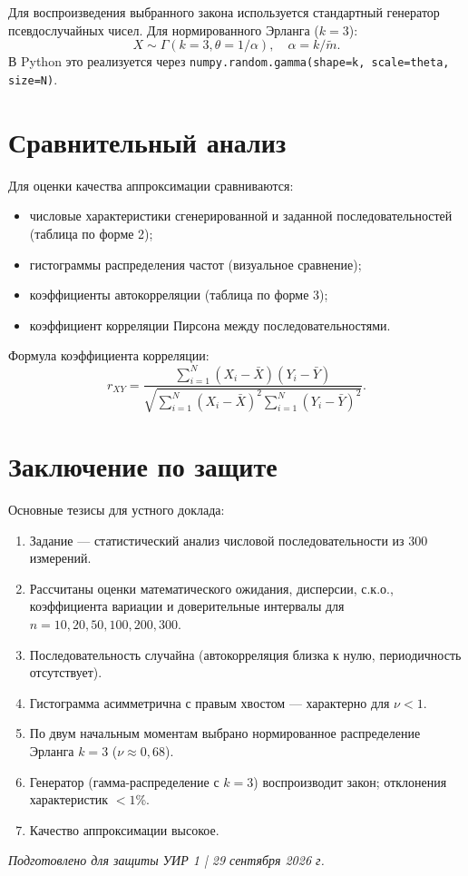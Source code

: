 \documentclass[a4paper,12pt]{article}
\begin{document}
Для воспроизведения выбранного закона используется стандартный генератор псевдослучайных чисел.
Для нормированного Эрланга ($k=3$):
\begin{equation}
X \sim \Gamma(k=3, \theta = 1/\alpha), \quad \alpha = k/\tilde{m}.
\end{equation}
В Python это реализуется через \texttt{numpy.random.gamma(shape=k, scale=theta, size=N)}.

\section{Сравнительный анализ}

Для оценки качества аппроксимации сравниваются:
\begin{itemize}
    \item числовые характеристики сгенерированной и заданной последовательностей (таблица по форме 2);
    \item гистограммы распределения частот (визуальное сравнение);
    \item коэффициенты автокорреляции (таблица по форме 3);
    \item коэффициент корреляции Пирсона между последовательностями.
\end{itemize}

Формула коэффициента корреляции:
\begin{equation}\label{eq:corr}
r_{XY} = \frac{\sum_{i=1}^{N}(X_i - \bar{X})(Y_i - \bar{Y})}{\sqrt{\sum_{i=1}^{N}(X_i - \bar{X})^2 \sum_{i=1}^{N}(Y_i - \bar{Y})^2}}.
\end{equation}

\section{Заключение по защите}

Основные тезисы для устного доклада:
\begin{enumerate}
    \item Задание — статистический анализ числовой последовательности из 300 измерений.
    \item Рассчитаны оценки математического ожидания, дисперсии, с.к.о., коэффициента вариации и доверительные интервалы для $n=10,20,50,100,200,300$.
    \item Последовательность случайна (автокорреляция близка к нулю, периодичность отсутствует).
    \item Гистограмма асимметрична с правым хвостом — характерно для $\nu < 1$.
    \item По двум начальным моментам выбрано нормированное распределение Эрланга $k=3$ ($\nu \approx 0{,}68$).
    \item Генератор (гамма-распределение с $k=3$) воспроизводит закон; отклонения характеристик $<1$\%.
    \item Качество аппроксимации высокое.
\end{enumerate}

\vfill
\begin{center}
\textit{Подготовлено для защиты УИР 1 | 29 сентября 2026 г.}
\end{center}
\end{document}
